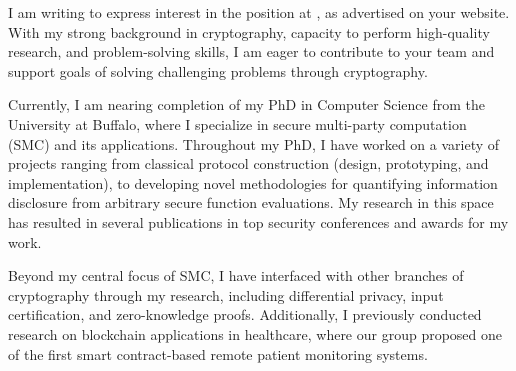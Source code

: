 
I am writing to express interest in the \position position at \company, as advertised on your website. With my strong background in cryptography, capacity to perform high-quality research, and problem-solving skills, I am eager to contribute to your team and support 
\companys goals of 
solving challenging problems through cryptography.


Currently, I am nearing completion of my PhD in Computer Science from the University at Buffalo, where I specialize in secure multi-party computation (SMC) and its applications. Throughout my PhD, I have worked on a variety of projects ranging from classical protocol construction (design, prototyping, and implementation), to developing novel methodologies for quantifying information disclosure from arbitrary secure function evaluations. 
My research in this space has resulted in several publications in top security conferences and awards for my work. 

Beyond my central focus of SMC, I have interfaced with other branches of cryptography through my research, including differential privacy, input certification, and zero-knowledge proofs. Additionally, I previously conducted research on blockchain applications in healthcare, where our group proposed one of the first smart contract-based remote patient monitoring systems.

